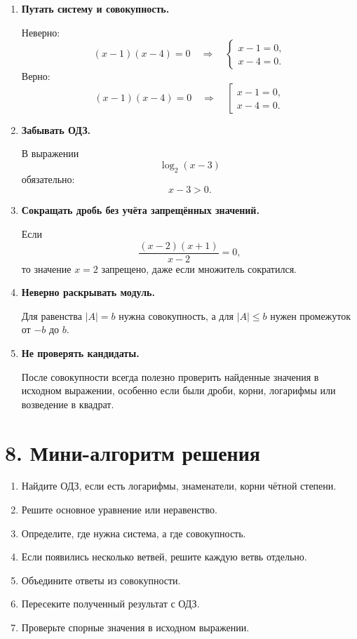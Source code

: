 \documentclass[a4paper,12pt]{article}
\newcommand{\important}[1]{\textcolor{darkaccent}{\textbf{#1}}}
\begin{document}
\begin{enumerate}
    \item \important{Путать систему и совокупность.}

    Неверно:
    \[
    (x-1)(x-4)=0
    \quad\Rightarrow\quad
    \begin{cases}
    x-1=0,\\
    x-4=0.
    \end{cases}
    \]
    Верно:
    \[
    (x-1)(x-4)=0
    \quad\Rightarrow\quad
    \left[
    \begin{array}{l}
    x-1=0,\\
    x-4=0.
    \end{array}
    \right.
    \]

    \item \important{Забывать ОДЗ.}

    В выражении
    \[
    \log_2(x-3)
    \]
    обязательно:
    \[
    x-3>0.
    \]

    \item \important{Сокращать дробь без учёта запрещённых значений.}

    Если
    \[
    \frac{(x-2)(x+1)}{x-2}=0,
    \]
    то значение $x=2$ запрещено, даже если множитель сократился.

    \item \important{Неверно раскрывать модуль.}

    Для равенства $|A|=b$ нужна совокупность, а для $|A|\le b$ нужен промежуток от $-b$ до $b$.

    \item \important{Не проверять кандидаты.}

    После совокупности всегда полезно проверить найденные значения в исходном выражении, особенно если были дроби, корни, логарифмы или возведение в квадрат.
\end{enumerate}

\section*{8. Мини-алгоритм решения}

\begin{enumerate}
    \item Найдите ОДЗ, если есть логарифмы, знаменатели, корни чётной степени.
    \item Решите основное уравнение или неравенство.
    \item Определите, где нужна система, а где совокупность.
    \item Если появились несколько ветвей, решите каждую ветвь отдельно.
    \item Объедините ответы из совокупности.
    \item Пересеките полученный результат с ОДЗ.
    \item Проверьте спорные значения в исходном выражении.
\end{enumerate}
\end{document}
